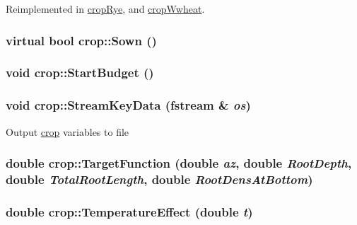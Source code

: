 Reimplemented in \hyperlink{classcrop_rye_a0e583eca63fb8a2f609763d1a319d891}{cropRye}, and \hyperlink{classcrop_wwheat_a48bc90182781fdf230087c37b372238d}{cropWwheat}.\hypertarget{classcrop_a218928e354da6f48a953731f2b5da527}{
\subsubsection[{Sown}]{\setlength{\rightskip}{0pt plus 5cm}virtual bool crop::Sown ()}}
\label{classcrop_a218928e354da6f48a953731f2b5da527}
\hypertarget{classcrop_a8c3a80a0de839c07691add129dbacafa}{
\subsubsection[{StartBudget}]{\setlength{\rightskip}{0pt plus 5cm}void crop::StartBudget ()}}
\label{classcrop_a8c3a80a0de839c07691add129dbacafa}
\hypertarget{classcrop_a442c2c4c3198041f6480f1e6f3a1f35e}{
\subsubsection[{StreamKeyData}]{\setlength{\rightskip}{0pt plus 5cm}void crop::StreamKeyData (fstream \& {\em os})}}
\label{classcrop_a442c2c4c3198041f6480f1e6f3a1f35e}
Output \hyperlink{classcrop}{crop} variables to file \hypertarget{classcrop_abfdb2b5e795f4843b14de933386afac9}{
\subsubsection[{TargetFunction}]{\setlength{\rightskip}{0pt plus 5cm}double crop::TargetFunction (double {\em az}, \/  double {\em RootDepth}, \/  double {\em TotalRootLength}, \/  double {\em RootDensAtBottom})}}
\label{classcrop_abfdb2b5e795f4843b14de933386afac9}
\hypertarget{classcrop_af01aa0fd15613a9e2fcb2a23ca089d5f}{
\subsubsection[{TemperatureEffect}]{\setlength{\rightskip}{0pt plus 5cm}double crop::TemperatureEffect (double {\em t})}}
